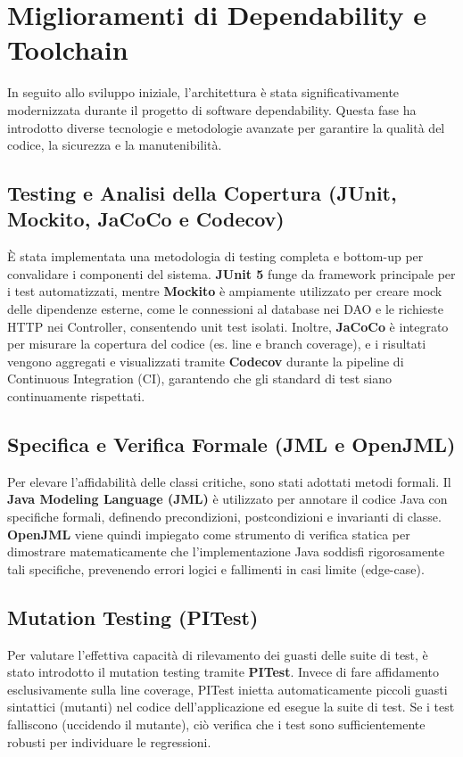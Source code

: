 \section{Miglioramenti di Dependability e Toolchain}
In seguito allo sviluppo iniziale, l'architettura è stata significativamente modernizzata durante il progetto di software dependability. Questa fase ha introdotto diverse tecnologie e metodologie avanzate per garantire la qualità del codice, la sicurezza e la manutenibilità.

\subsection{Testing e Analisi della Copertura (JUnit, Mockito, JaCoCo e Codecov)}
È stata implementata una metodologia di testing completa e bottom-up per convalidare i componenti del sistema. \textbf{JUnit 5} funge da framework principale per i test automatizzati, mentre \textbf{Mockito} è ampiamente utilizzato per creare mock delle dipendenze esterne, come le connessioni al database nei DAO e le richieste HTTP nei Controller, consentendo unit test isolati. Inoltre, \textbf{JaCoCo} è integrato per misurare la copertura del codice (es. line e branch coverage), e i risultati vengono aggregati e visualizzati tramite \textbf{Codecov} durante la pipeline di Continuous Integration (CI), garantendo che gli standard di test siano continuamente rispettati.

\subsection{Specifica e Verifica Formale (JML e OpenJML)}
Per elevare l'affidabilità delle classi critiche, sono stati adottati metodi formali. Il \textbf{Java Modeling Language (JML)} è utilizzato per annotare il codice Java con specifiche formali, definendo precondizioni, postcondizioni e invarianti di classe. \textbf{OpenJML} viene quindi impiegato come strumento di verifica statica per dimostrare matematicamente che l'implementazione Java soddisfi rigorosamente tali specifiche, prevenendo errori logici e fallimenti in casi limite (edge-case).

\subsection{Mutation Testing (PITest)}
Per valutare l'effettiva capacità di rilevamento dei guasti delle suite di test, è stato introdotto il mutation testing tramite \textbf{PITest}. Invece di fare affidamento esclusivamente sulla line coverage, PITest inietta automaticamente piccoli guasti sintattici (mutanti) nel codice dell'applicazione ed esegue la suite di test. Se i test falliscono (uccidendo il mutante), ciò verifica che i test sono sufficientemente robusti per individuare le regressioni.

